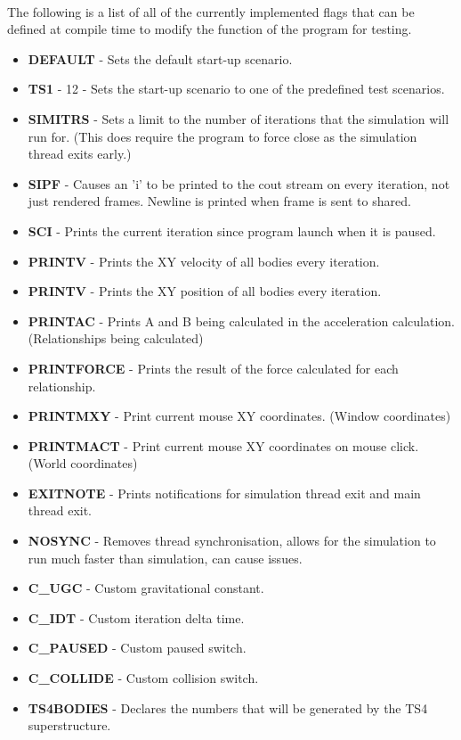 \paragraph{}
The following is a list of all of the currently implemented flags that can be defined at compile time to modify the function of the program for testing.\\
\begin{itemize}
\footnotesize
\item \textbf{DEFAULT} - Sets the default start-up scenario.
\item \textbf{TS1} - 12 - Sets the start-up scenario to one of the predefined test scenarios.
\item \textbf{SIMITRS} - Sets a limit to the number of iterations that the simulation will run for. (This does require the program to force close as the simulation thread exits early.)
\item \textbf{SIPF} - Causes an 'i' to be printed to the cout stream on every iteration, not just rendered frames. Newline is printed when frame is sent to shared.
\item \textbf{SCI} - Prints the current iteration since program launch when it is paused.
\item \textbf{PRINTV} - Prints the XY velocity of all bodies every iteration.
\item \textbf{PRINTV} - Prints the XY position of all bodies every iteration.
\item \textbf{PRINTAC} - Prints A and B being calculated in the acceleration calculation. (Relationships being calculated)
\item \textbf{PRINTFORCE} - Prints the result of the force calculated for each relationship. 
\item \textbf{PRINTMXY} - Print current mouse XY coordinates. (Window coordinates)
\item \textbf{PRINTMACT} - Print current mouse XY coordinates on mouse click. (World coordinates)
\item \textbf{EXITNOTE} - Prints notifications for simulation thread exit and main thread exit.
\item \textbf{NOSYNC} - Removes thread synchronisation, allows for the simulation to run much faster than simulation, can cause issues.
\item \textbf{C\_UGC} - Custom gravitational constant.
\item \textbf{C\_IDT} - Custom iteration delta time.
\item \textbf{C\_PAUSED} - Custom paused switch.
\item \textbf{C\_COLLIDE} - Custom collision switch.
\item \textbf{TS4BODIES} - Declares the numbers that will be generated by the TS4 superstructure.
\end{itemize}

